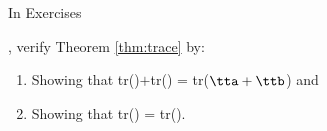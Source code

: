 {\noin In Exercises }
{, verify Theorem \ref{thm:trace} by:
\begin{enumerate}
\item	Showing that tr(\tta)$+$tr(\ttb) = tr($\tta+\ttb$) and
\item	Showing that tr(\tta\ttb) = tr(\ttb\tta).
\end{enumerate}
}

